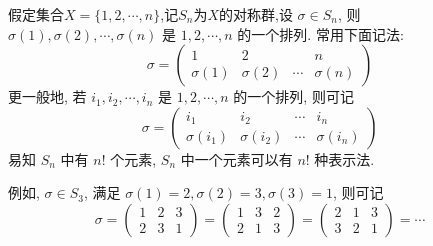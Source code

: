 \documentclass[../../main.tex]{subfiles}
\begin{document}
\begin{example}
假定集合\( X = \{1, 2, \cdots, n\} \),记$S_n$为$X$的对称群,设 \( \sigma \in S_n \), 则 \( \sigma(1), \sigma(2), \cdots, \sigma(n) \) 是 \( 1, 2, \cdots, n \) 的一个排列. 常用下面记法:
\[
\sigma = \begin{pmatrix} 1 & 2 & & n \\ \sigma(1) & \sigma(2) & \cdots & \sigma(n) \end{pmatrix}
\]
更一般地, 若 \( i_1, i_2, \cdots, i_n \) 是 \( 1, 2, \cdots, n \) 的一个排列, 则可记
\[
\sigma = \begin{pmatrix} i_1 & i_2 & \cdots & i_n \\ \sigma(i_1) & \sigma(i_2) & \cdots & \sigma(i_n) \end{pmatrix}
\]
易知 \( S_n \) 中有 \( n! \) 个元素, \( S_n \) 中一个元素可以有 \( n! \) 种表示法.

例如, \( \sigma \in S_3 \), 满足 \( \sigma(1) = 2, \sigma(2) = 3, \sigma(3) = 1 \), 则可记
\[
\sigma = \begin{pmatrix} 1 & 2 & 3 \\ 2 & 3 & 1 \end{pmatrix} = \begin{pmatrix} 1 & 3 & 2 \\ 2 & 1 & 3 \end{pmatrix} = \begin{pmatrix} 2 & 1 & 3 \\ 3 & 2 & 1 \end{pmatrix} = \cdots
\]
\end{example} 
\end{document}
